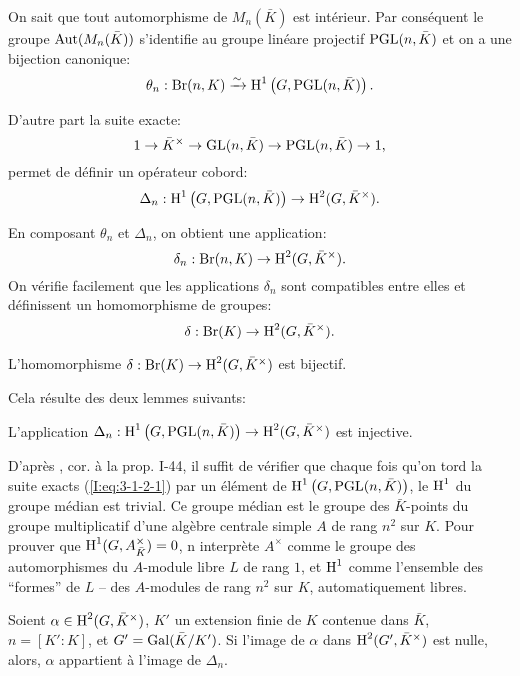 On sait que tout automorphisme de $M_n(\bar K)$ est intérieur. Par 
conséquent le groupe $\operatorname{Aut}(M_n(\bar K))$ s'identifie au groupe linéare 
projectif $\operatorname{PGL}(n,\bar K)$ et on a une bijection canonique:
\[
  \theta_n : \operatorname{Br}(n,K) \xrightarrow\sim \operatorname{H}^1\left(G,\operatorname{PGL}(n,\bar K)\right)\text{.}
\]

D'autre part la suite exacte:
\begin{equation}\label{I:eq:3-1-2-1}
  1 \to \bar K^\times \to \operatorname{GL}(n,\bar K) \to \operatorname{PGL}(n,\bar K) \to 1\text{,}
\end{equation}
permet de définir un opérateur cobord:
\[
  \Delta_n : \operatorname{H}^1\left(G,\operatorname{PGL}(n,\bar K)\right) \to \operatorname{H}^2(G,\bar K^\times)\text{.}
\]

En composant $\theta_n$ et $\Delta_n$, on obtient une application:
\[
  \delta_n : \operatorname{Br}(n,K) \to \operatorname{H}^2(G,\bar K^\times)\text{.}
\]
On vérifie facilement que les applications $\delta_n$ sont compatibles entre 
elles et définissent un homomorphisme de groupes:
\[
  \delta : \operatorname{Br}(K) \to \operatorname{H}^2(G,\bar K^\times)\text{.}
\]





\begin{proposition}\label{I:3-1-3}
L'homomorphisme $\delta:\operatorname{Br}(K)\to \operatorname{H}^2(G,\bar K^\times)$ est bijectif. 
\end{proposition}

Cela résulte des deux lemmes suivants:





\begin{lemma}\label{I:3-1-4}
L'application 
$\Delta_n:\operatorname{H}^1\left(G,\operatorname{PGL}(n,\bar K)\right)\to \operatorname{H}^2(G,\bar K^\times)$ est 
injective.
\end{lemma}

D'après \cite{se94}, cor. à la prop. I-44, il suffit de vérifier que chaque 
fois qu'on tord la suite exacts (\ref{I:eq:3-1-2-1}) par un élément de 
$\operatorname{H}^1\left(G,\operatorname{PGL}(n,\bar K)\right)$, le $\operatorname{H}^1$ du groupe médian est trivial. 
Ce groupe médian est le groupe des $\bar K$-points du groupe multiplicatif 
d'une algèbre centrale simple $A$ de rang $n^2$ sur $K$. Pour prouver que 
$\operatorname{H}^1(G,A_{\bar K}^\times) = 0$, n interprète $A^\times$ comme le groupe 
des automorphismes du $A$-module libre $L$ de rang $1$, et $\operatorname{H}^1$ comme 
l'ensemble des ``formes'' de $L$ -- des $A$-modules de rang $n^2$ sur $K$, 
automatiquement libres. 





\begin{lemma}\label{I:3-1-5}
Soient $\alpha\in \operatorname{H}^2(G,\bar K^\times)$, $K'$ un extension finie de $K$ 
contenue dans $\bar K$, $n=[K':K]$, et $G'=\operatorname{Gal}(\bar K/K')$. Si l'image de 
$\alpha$ dans $\operatorname{H}^2(G',\bar K^\times)$ est nulle, alors, $\alpha$ appartient 
à l'image de $\Delta_n$. 
\end{lemma}

